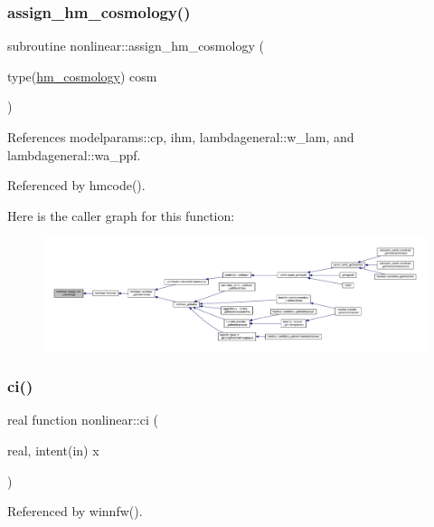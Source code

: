 \subsubsection{\texorpdfstring{assign\+\_\+hm\+\_\+cosmology()}{assign\_hm\_cosmology()}}
{\footnotesize\ttfamily subroutine nonlinear\+::assign\+\_\+hm\+\_\+cosmology (\begin{DoxyParamCaption}\item[{type(\mbox{\hyperlink{structnonlinear_1_1hm__cosmology}{hm\+\_\+cosmology}})}]{cosm }\end{DoxyParamCaption})\hspace{0.3cm}{\ttfamily [private]}}



References modelparams\+::cp, ihm, lambdageneral\+::w\+\_\+lam, and lambdageneral\+::wa\+\_\+ppf.



Referenced by hmcode().

Here is the caller graph for this function\+:
\nopagebreak
\begin{figure}[H]
\begin{center}
\leavevmode
\includegraphics[width=350pt]{namespacenonlinear_a44e107b52cde4df598539a1ed12f252a_icgraph}
\end{center}
\end{figure}
\mbox{\label{namespacenonlinear_a723581002925fb14e73f4d80ce6ee6e5}} 
\subsubsection{\texorpdfstring{ci()}{ci()}}
{\footnotesize\ttfamily real function nonlinear\+::ci (\begin{DoxyParamCaption}\item[{real, intent(in)}]{x }\end{DoxyParamCaption})\hspace{0.3cm}{\ttfamily [private]}}



Referenced by winnfw().

